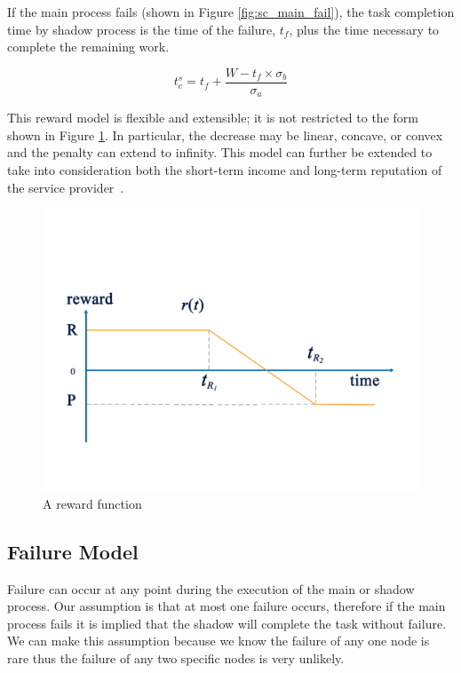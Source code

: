 If the main process fails (shown in Figure \ref{fig:sc_main_fail}), the
task completion time by shadow process is the time of the failure,
$t_f$, plus the time necessary to complete the remaining work.

\begin{equation}
t_c^s=t_f+\frac{W-t_f \times \sigma_b}{\sigma_a}
\label{eq:tcs}
\end{equation}

This reward model is flexible and extensible; it is not restricted to
the form shown in Figure \ref{fig:reward}. In particular, the decrease
may be linear, concave, or convex and the penalty can extend to
infinity. This model can further be extended to take into
consideration both the short-term income and long-term reputation of
the service provider~\cite{Daw:2002:LRP:639717.639720}.


\begin{figure}[t!]	
	\begin{center}
		\includegraphics[width=\columnwidth]{diagrams/reward.pdf}
	\end{center}
	\caption{A reward function}
	\label{fig:reward}
\end{figure}


\subsection{Failure Model}
Failure can occur at any point during the execution of the main or
shadow process. Our assumption is that at most one failure occurs,
therefore if the main process fails it is implied that the shadow will
complete the task without failure. We can make this assumption because
we know the failure of any one node is rare thus the failure
of any two specific nodes is very unlikely.

